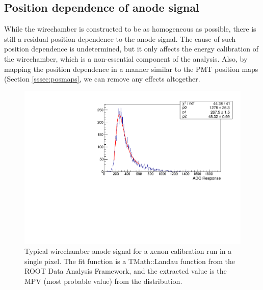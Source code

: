 \subsection{Position dependence of anode signal}

While the wirechamber is constructed to be as homogeneous as possible, there is still a residual
position dependence to the anode signal. The cause of such position dependence is undetermined,
but it only affects the energy calibration of the wirechamber, which is
a non-essential component of the analysis. Also, by mapping the position dependence in a manner
similar to the PMT position maps (Section \ref{sssec:posmaps}, we can remove any effects altogether.

\begin{figure}[h]
  \centering
  \includegraphics[scale=0.5,page=1]{4-UCNACalibrations/MWPCPositionMapSpectrum.pdf}
  \caption{Typical wirechamber anode signal for a xenon calibration run in a
    single pixel. The fit function is a TMath::Landau function from the ROOT Data Analysis
    Framework, and the extracted value is the MPV (most probable value) from the
    distribution.}
  \label{fig:xenonMWPCsignal}
\end{figure}

